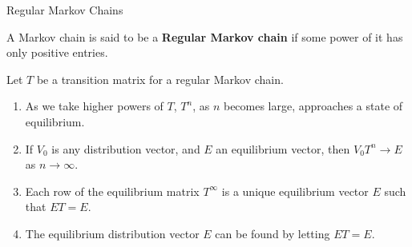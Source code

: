 \begin{summarybox}{Regular Markov Chains}

    A Markov chain is said to be a \textbf{Regular Markov chain} if some power of it has only positive entries.

    Let \( T \) be a transition matrix for a regular Markov chain.
    \begin{enumerate}
        \item As we take higher powers of \( T \), \( T^n \), as \( n \) becomes large, approaches a state of equilibrium.
        \item If \( V_0 \) is any distribution vector, and \( E \) an equilibrium vector, then \( V_0T^n \to E \) as \(n\to\infty\).
        \item Each row of the equilibrium matrix \( T^\infty \) is a unique equilibrium vector \( E \) such that \( ET = E \).
        \item The equilibrium distribution vector \( E \) can be found by letting \( ET = E \).
    \end{enumerate}
\end{summarybox}
